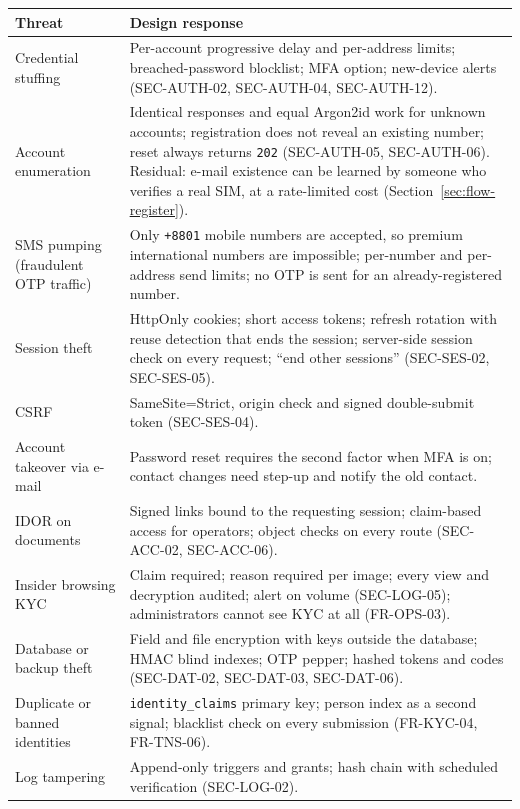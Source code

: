 \documentclass[11pt,a4paper]{article}
\newenvironment{dtable}[1]{\small\begin{longtable}{#1}}{\end{longtable}}
\begin{document}
\begin{dtable}{@{}>{\raggedright\arraybackslash}p{4.0cm}>{\raggedright\arraybackslash}p{11.2cm}@{}}
\toprule
\textbf{Threat} & \textbf{Design response} \\ \midrule \endhead
Credential stuffing & Per-account progressive delay and per-address limits; breached-password blocklist; MFA option; new-device alerts (SEC-AUTH-02, SEC-AUTH-04, SEC-AUTH-12). \\
Account enumeration & Identical responses and equal Argon2id work for unknown accounts; registration does not reveal an existing number; reset always returns \texttt{202} (SEC-AUTH-05, SEC-AUTH-06). Residual: e-mail existence can be learned by someone who verifies a real SIM, at a rate-limited cost (Section~\ref{sec:flow-register}). \\
SMS pumping (fraudulent OTP traffic) & Only \texttt{+8801} mobile numbers are accepted, so premium international numbers are impossible; per-number and per-address send limits; no OTP is sent for an already-registered number. \\
Session theft & HttpOnly cookies; short access tokens; refresh rotation with reuse detection that ends the session; server-side session check on every request; ``end other sessions'' (SEC-SES-02, SEC-SES-05). \\
CSRF & SameSite=Strict, origin check and signed double-submit token (SEC-SES-04). \\
Account takeover via e-mail & Password reset requires the second factor when MFA is on; contact changes need step-up and notify the old contact. \\
IDOR on documents & Signed links bound to the requesting session; claim-based access for operators; object checks on every route (SEC-ACC-02, SEC-ACC-06). \\
Insider browsing KYC & Claim required; reason required per image; every view and decryption audited; alert on volume (SEC-LOG-05); administrators cannot see KYC at all (FR-OPS-03). \\
Database or backup theft & Field and file encryption with keys outside the database; HMAC blind indexes; OTP pepper; hashed tokens and codes (SEC-DAT-02, SEC-DAT-03, SEC-DAT-06). \\
Duplicate or banned identities & \texttt{identity\_claims} primary key; person index as a second signal; blacklist check on every submission (FR-KYC-04, FR-TNS-06). \\
Log tampering & Append-only triggers and grants; hash chain with scheduled verification (SEC-LOG-02). \\
\bottomrule
\end{dtable}
\end{document}
